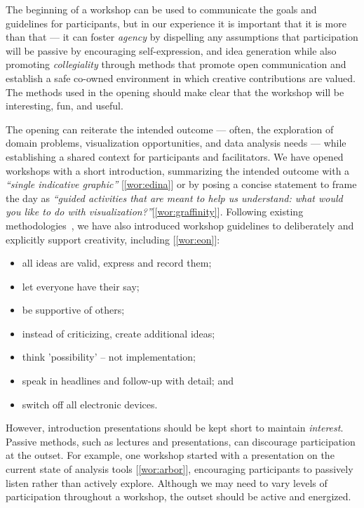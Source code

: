 The beginning of a workshop can be used to communicate the goals and guidelines for participants, but in our experience it is important that it is more than that --- it can foster {\it agency} by dispelling any assumptions that participation will be passive by encouraging self-expression, and idea generation while also promoting {\it collegiality} through methods that promote open communication and establish a safe co-owned environment in which creative contributions are valued. The methods used in the opening should make clear that the workshop will be interesting, fun, and useful.

The opening can reiterate the intended outcome --- often, the exploration of domain problems, visualization opportunities, and data analysis needs --- while establishing a shared context for participants and facilitators. We have opened workshops with a short introduction, summarizing the intended outcome with a \emph{``single indicative graphic''} [\ref{wor:edina}] or by posing a concise statement to frame the day as \emph{``guided activities that are meant to help us understand: what would you like to do with visualization?''}[\ref{wor:graffinity}]. Following existing methodologies~\cite{CreativeEducationFoundation2015,Osborn1953}, we have also introduced workshop guidelines to deliberately and explicitly support creativity, including [\ref{wor:eon}]:
\begin{itemize}[noitemsep,nolistsep]
\item all ideas are valid, express and record them;
\item let everyone have their say; 
\item be supportive of others; 
\item instead of criticizing, create additional ideas;
\item think 'possibility' -- not implementation; 
\item speak in headlines and follow-up with detail; and 
\item switch off all electronic devices.
\end{itemize}

However, introduction presentations should be kept short to maintain {\it interest}. Passive methods, such as lectures and presentations, can discourage participation at the outset. For example, one workshop started with a presentation on the current state of analysis tools [\ref{wor:arbor}], encouraging participants to passively listen rather than actively explore. Although we may need to vary levels of participation throughout a workshop, the outset should be active and energized.

